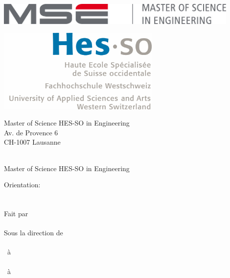 
\begin{titlepage}
{\selectfont
	\begin{flushright}
		\begin{minipage}{0.5\textwidth}
			\begin{flushleft}
				\includegraphics[width=0.9\textwidth]{img/mse_logo}
			\end{flushleft}
		\end{minipage}%
		\begin{minipage}{0.5\textwidth}
			\begin{flushright}
				\includegraphics[width=0.6\textwidth]{img/hesso_logo}
			\end{flushright}
		\end{minipage}
		\begin{flushleft}
			\footnotesize
			Master of Science HES-SO in Engineering \\
			Av. de Provence 6 \\
			CH-1007 Lausanne
		\end{flushleft}
		~\\[0.5cm]
		
		{
		\Huge Master of Science HES-SO in Engineering\\[0.5cm]
		}
		
		{
		\LARGE Orientation: \Orientation\\[0.5cm]
		~\\[1cm]
		}
		{
			\Huge
			\ThesisTitle \\[1.5cm]
		}
		{
			\large
			Fait par\\[-0.3cm]
			\Huge \Author \\[0.8cm]
		}
		{
			\large
			Sous la direction de\\
			\Advisor \\
			\AdvisorResearchUnit \ à \AdvisorSchool\\
			\CoAdvisor \\
			\CoAdvisorResearchUnit \ à \CoAdvisorSchool \\[0.5cm]
		}
		{
			\large
		}
		\vfill
		

\end{flushright}}
\end{titlepage}
